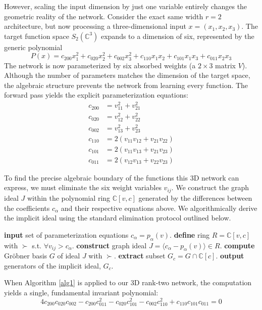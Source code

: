 \documentclass[12pt]{amsproc}
\renewcommand{\-}{\setminus}
\newcommand\<{\langle}
\renewcommand\>{\rangle}
\newcommand{\Input}{\State\textbf{input} }
\theoremstyle{plain}
\theoremstyle{definition}
\theoremstyle{remark}
\begin{document}
However, scaling the input dimension by just one variable entirely changes the geometric reality of the network. Consider the exact same width $r=2$ architecture, but now processing a three-dimensional input $x = (x_1, x_2, x_3)$. The target function space $S_2(\mathbb{C}^3)$ expands to a dimension of six, represented by the generic polynomial
\[
P(x) = c_{200}x_1^2 + c_{020}x_2^2 + c_{002}x_3^2 + c_{110}x_1x_2 + c_{101}x_1x_3 + c_{011}x_2x_3
\]
The network is now parameterized by six absorbed weights (a $2 \times 3$ matrix $V$). Although the number of parameters matches the dimension of the target space, the algebraic structure prevents the network from learning every function. The forward pass yields the explicit parameterization equations:
\begin{align*}
c_{200} &= v_{11}^2 + v_{21}^2 \\
c_{020} &= v_{12}^2 + v_{22}^2 \\
c_{002} &= v_{13}^2 + v_{23}^2 \\
c_{110} &= 2(v_{11}v_{12} + v_{21}v_{22}) \\
c_{101} &= 2(v_{11}v_{13} + v_{21}v_{23}) \\
c_{011} &= 2(v_{12}v_{13} + v_{22}v_{23})
\end{align*}

To find the precise algebraic boundary of the functions this 3D network can express, we must eliminate the six weight variables $v_{ij}$. We construct the graph ideal $J$ within the polynomial ring $\mathbb{C}[v, c]$ generated by the differences between the coefficients $c_\alpha$ and their respective equations above. We algorithmically derive the implicit ideal using the standard elimination protocol outlined below.

\begin{algorithm}
\caption{Implicitization via Gröbner Basis Elimination}
\label{alg1}
\begin{algorithmic}
\Input set of parameterization equations $c_\alpha = p_\alpha(v)$.
\State \textbf{define} ring $R = \mathbb{C}[v, c]$ with $\succ$ s.t. $\forall v_{ij} > c_\alpha$.
\State \textbf{construct} graph ideal $J = \langle c_\alpha - p_\alpha(v) \rangle \in R$.
\State \textbf{compute} Gröbner basis $G$ of ideal $J$ with $\succ$. 
\State \textbf{extract} subset $G_c = G \cap \mathbb{C}[c]$.
\State \textbf{output} generators of the implicit ideal, $G_c$.
\end{algorithmic}
\end{algorithm}

When Algorithm \ref{alg1} is applied to our 3D rank-two network, the computation yields a single, fundamental invariant polynomial:
\[
4c_{200}c_{020}c_{002} - c_{200}c_{011}^2 - c_{020}c_{101}^2 - c_{002}c_{110}^2 + c_{110}c_{101}c_{011} = 0
\]
\end{document}
